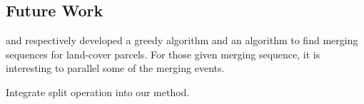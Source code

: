 \documentclass[ijgi,article,submit,moreauthors,pdftex]{Definitions/mdpi}
\begin{document}
\subsection{Future Work}

\citet{vanOosterom2005} and \citet[]{Peng2019Thesis}
respectively developed a greedy algorithm and an \Astar algorithm to find
merging sequences for land-cover parcels.
For those given merging sequence,
it is interesting to parallel some of the merging events.

Integrate split operation into our method.

%
%
%
%
%
\end{document}
